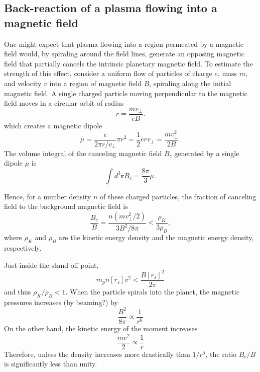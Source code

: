 \documentclass[iop,numberedappendix,apj]{emulateapj}
\begin{document}
\subsection{Back-reaction of a plasma flowing into a magnetic field}
\label{ss:offset}

One might expect that plasma flowing into a region permeated by a magnetic field would, by spiraling around the field lines, generate an opposing magnetic field that partially cancels the intrinsic planetary magnetic field. 
To estimate the strength of this effect, consider a uniform flow of particles of charge $e$, mass $m$, and velocity $v$ into a region of magnetic field $B$, spiraling along the initial magnetic field. 
A single charged particle moving perpendicular to the magnetic field moves in a circular orbit of radius 
\begin{equation}
r=\frac{mv_\bot }{eB}.
\end{equation}
which creates a magnetic dipole
\begin{equation}
\mu = \frac{e}{2\pi r/v_\bot} \pi r^2 = \frac{1}{2} e r v_\bot = \frac{mv_\bot^2}{2B}.
\end{equation}
The volume integral of the canceling magnetic field $B_c$ generated by a single dipole $\mu$ is
\begin{equation}
\int d^3{\boldsymbol r} B_c = \frac{8\pi}{3} \mu.
\end{equation}

Hence, for a number density $n$ of these charged particles, the fraction of canceling field to the background magnetic field is
\begin{equation}
\frac{B_c}{B} = \frac{n(mv_\bot^2/2)}{3 B^2/8\pi} < \frac{\rho_K}{3\rho_B},
\end{equation}
where $\rho_K$ and $\rho_B$ are the kinetic energy density and the magnetic energy density, respectively. 

Just inside the stand-off point, 
\begin{equation}
m_p n[r_s] v^2 < \frac{B[r_s]^2}{2\pi }
\end{equation}
and thus $\rho_K/\rho _B < 1$. 
When the particle spirals into the planet, 
the magnetic pressures increases (by beaming?) by 
\begin{equation}
\frac{B^2}{8\pi } \propto \frac{1}{r^6}
\end{equation}
On the other hand, the kinetic energy of the moment increases
\begin{equation}
\frac{mv^2}{2} \propto \frac{1}{r}
\end{equation}
Therefore, unless the density increases more drastically than $1/r^5$, the ratio $B_c/B$ is significantly less than unity. 
\end{document}
